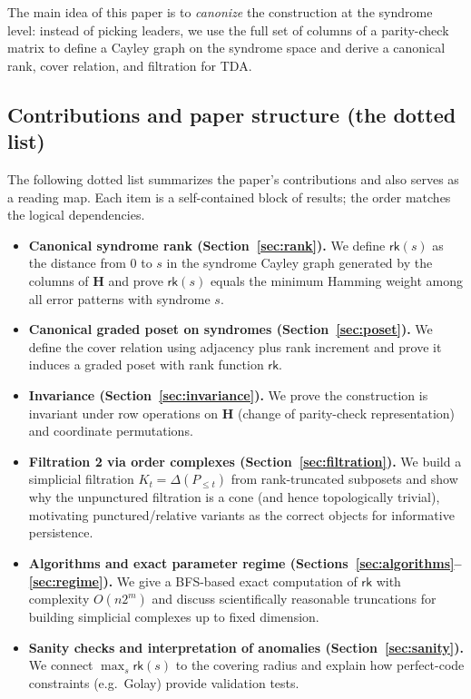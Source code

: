 \documentclass[11pt,twoside,leqno]{article}
\theoremstyle{definition}
\theoremstyle{plain}
\theoremstyle{remark}
\newcommand{\rk}{\mathsf{rk}}
\newcommand{\HH}{\mathbf{H}}
\begin{document}
The main idea of this paper is to \emph{canonize} the construction at the syndrome level: instead of picking leaders,
we use the full set of columns of a parity-check matrix to define a Cayley graph on the syndrome space and derive
a canonical rank, cover relation, and filtration for TDA.

\subsection{Contributions and paper structure (the dotted list)}
The following dotted list summarizes the paper's contributions and also serves as a reading map. Each item is a
self-contained block of results; the order matches the logical dependencies.

\begin{itemize}[leftmargin=*,itemsep=2pt]
\item[\textbullet] \textbf{Canonical syndrome rank (Section~\ref{sec:rank}).}
We define $\rk(s)$ as the distance from $0$ to $s$ in the syndrome Cayley graph generated by the columns of $\HH$
and prove $\rk(s)$ equals the minimum Hamming weight among all error patterns with syndrome $s$.

\item[\textbullet] \textbf{Canonical graded poset on syndromes (Section~\ref{sec:poset}).}
We define the cover relation using adjacency plus rank increment and prove it induces a graded poset with rank function $\rk$.

\item[\textbullet] \textbf{Invariance (Section~\ref{sec:invariance}).}
We prove the construction is invariant under row operations on $\HH$ (change of parity-check representation) and coordinate permutations.

\item[\textbullet] \textbf{Filtration 2 via order complexes (Section~\ref{sec:filtration}).}
We build a simplicial filtration $K_t=\Delta(P_{\le t})$ from rank-truncated subposets and show why the unpunctured filtration is a cone
(and hence topologically trivial), motivating punctured/relative variants as the correct objects for informative persistence.

\item[\textbullet] \textbf{Algorithms and exact parameter regime (Sections~\ref{sec:algorithms}--\ref{sec:regime}).}
We give a BFS-based exact computation of $\rk$ with complexity $O(n2^m)$ and discuss scientifically reasonable truncations for
building simplicial complexes up to fixed dimension.

\item[\textbullet] \textbf{Sanity checks and interpretation of anomalies (Section~\ref{sec:sanity}).}
We connect $\max_s\rk(s)$ to the covering radius and explain how perfect-code constraints (e.g.\ Golay) provide validation tests.
\end{itemize}
\end{document}
